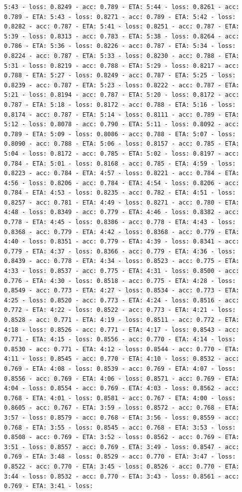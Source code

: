 \documentclass[11pt]{article}
\begin{document}
\begin{Verbatim}[commandchars=\\\{\}]
5:43 - loss: 0.8249 - acc: 0.789 - ETA: 5:44 - loss: 0.8261 - acc: 0.789 - ETA: 5:43 - loss: 0.8271 - acc: 0.789 - ETA: 5:42 - loss: 0.8282 - acc: 0.787 - ETA: 5:41 - loss: 0.8251 - acc: 0.787 - ETA: 5:39 - loss: 0.8313 - acc: 0.783 - ETA: 5:38 - loss: 0.8264 - acc: 0.786 - ETA: 5:36 - loss: 0.8226 - acc: 0.787 - ETA: 5:34 - loss: 0.8224 - acc: 0.787 - ETA: 5:33 - loss: 0.8230 - acc: 0.788 - ETA: 5:31 - loss: 0.8219 - acc: 0.788 - ETA: 5:29 - loss: 0.8217 - acc: 0.788 - ETA: 5:27 - loss: 0.8249 - acc: 0.787 - ETA: 5:25 - loss: 0.8239 - acc: 0.787 - ETA: 5:23 - loss: 0.8222 - acc: 0.787 - ETA: 5:21 - loss: 0.8194 - acc: 0.787 - ETA: 5:20 - loss: 0.8172 - acc: 0.787 - ETA: 5:18 - loss: 0.8172 - acc: 0.788 - ETA: 5:16 - loss: 0.8174 - acc: 0.787 - ETA: 5:14 - loss: 0.8111 - acc: 0.789 - ETA: 5:12 - loss: 0.8078 - acc: 0.790 - ETA: 5:11 - loss: 0.8092 - acc: 0.789 - ETA: 5:09 - loss: 0.8086 - acc: 0.788 - ETA: 5:07 - loss: 0.8090 - acc: 0.788 - ETA: 5:06 - loss: 0.8157 - acc: 0.785 - ETA: 5:04 - loss: 0.8172 - acc: 0.785 - ETA: 5:02 - loss: 0.8197 - acc: 0.784 - ETA: 5:01 - loss: 0.8168 - acc: 0.785 - ETA: 4:59 - loss: 0.8223 - acc: 0.784 - ETA: 4:57 - loss: 0.8221 - acc: 0.784 - ETA: 4:56 - loss: 0.8206 - acc: 0.784 - ETA: 4:54 - loss: 0.8206 - acc: 0.784 - ETA: 4:53 - loss: 0.8235 - acc: 0.782 - ETA: 4:51 - loss: 0.8257 - acc: 0.781 - ETA: 4:49 - loss: 0.8271 - acc: 0.780 - ETA: 4:48 - loss: 0.8349 - acc: 0.779 - ETA: 4:46 - loss: 0.8382 - acc: 0.778 - ETA: 4:45 - loss: 0.8386 - acc: 0.778 - ETA: 4:43 - loss: 0.8368 - acc: 0.779 - ETA: 4:42 - loss: 0.8368 - acc: 0.779 - ETA: 4:40 - loss: 0.8351 - acc: 0.779 - ETA: 4:39 - loss: 0.8341 - acc: 0.779 - ETA: 4:37 - loss: 0.8366 - acc: 0.779 - ETA: 4:36 - loss: 0.8439 - acc: 0.778 - ETA: 4:34 - loss: 0.8523 - acc: 0.775 - ETA: 4:33 - loss: 0.8537 - acc: 0.775 - ETA: 4:31 - loss: 0.8500 - acc: 0.776 - ETA: 4:30 - loss: 0.8518 - acc: 0.775 - ETA: 4:28 - loss: 0.8549 - acc: 0.773 - ETA: 4:27 - loss: 0.8534 - acc: 0.773 - ETA: 4:25 - loss: 0.8520 - acc: 0.773 - ETA: 4:24 - loss: 0.8516 - acc: 0.772 - ETA: 4:22 - loss: 0.8522 - acc: 0.773 - ETA: 4:21 - loss: 0.8528 - acc: 0.771 - ETA: 4:19 - loss: 0.8511 - acc: 0.772 - ETA: 4:18 - loss: 0.8526 - acc: 0.771 - ETA: 4:17 - loss: 0.8543 - acc: 0.771 - ETA: 4:15 - loss: 0.8556 - acc: 0.770 - ETA: 4:14 - loss: 0.8530 - acc: 0.771 - ETA: 4:12 - loss: 0.8544 - acc: 0.770 - ETA: 4:11 - loss: 0.8545 - acc: 0.770 - ETA: 4:10 - loss: 0.8532 - acc: 0.769 - ETA: 4:08 - loss: 0.8539 - acc: 0.769 - ETA: 4:07 - loss: 0.8556 - acc: 0.769 - ETA: 4:06 - loss: 0.8571 - acc: 0.769 - ETA: 4:04 - loss: 0.8554 - acc: 0.769 - ETA: 4:03 - loss: 0.8562 - acc: 0.768 - ETA: 4:01 - loss: 0.8581 - acc: 0.767 - ETA: 4:00 - loss: 0.8605 - acc: 0.767 - ETA: 3:59 - loss: 0.8572 - acc: 0.768 - ETA: 3:57 - loss: 0.8579 - acc: 0.768 - ETA: 3:56 - loss: 0.8559 - acc: 0.768 - ETA: 3:55 - loss: 0.8545 - acc: 0.768 - ETA: 3:53 - loss: 0.8508 - acc: 0.769 - ETA: 3:52 - loss: 0.8562 - acc: 0.769 - ETA: 3:51 - loss: 0.8557 - acc: 0.769 - ETA: 3:49 - loss: 0.8547 - acc: 0.769 - ETA: 3:48 - loss: 0.8529 - acc: 0.770 - ETA: 3:47 - loss: 0.8522 - acc: 0.770 - ETA: 3:45 - loss: 0.8526 - acc: 0.770 - ETA: 3:44 - loss: 0.8532 - acc: 0.770 - ETA: 3:43 - loss: 0.8561 - acc: 0.769 - ETA: 3:41 - loss: 
\end{Verbatim}
\end{document}
